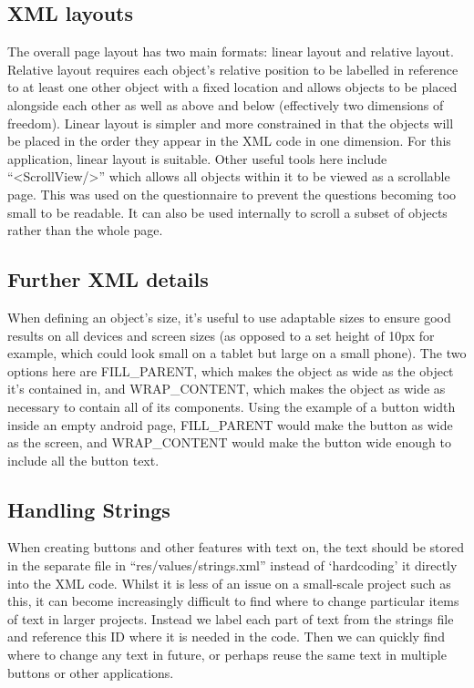 \subsection{XML layouts}
The overall page layout has two main formats: linear layout and relative layout. Relative layout requires each object’s relative position to be labelled in reference to at least one other object with a fixed location and allows objects to be placed alongside each other as well as above and below (effectively two dimensions of freedom). Linear layout is simpler and more constrained in that the objects will be placed in the order they appear in the XML code in one dimension. For this application, linear layout is suitable. Other useful tools here include ``\textless ScrollView/\textgreater'' which allows all objects within it to be viewed as a scrollable page. This was used on the questionnaire to prevent the questions becoming too small to be readable. It can also be used internally to scroll a subset of objects rather than the whole page.
\subsection{Further XML details}
When defining an object’s size, it’s useful to use adaptable sizes to ensure good results on all devices and screen sizes (as opposed to a set height of 10px for example, which could look small on a tablet but large on a small phone). The two options here are FILL\_PARENT, which makes the object as wide as the object it’s contained in, and WRAP\_CONTENT, which makes the object as wide as necessary to contain all of its components. Using the example of a button width inside an empty android page, FILL\_PARENT would make the button as wide as the screen, and WRAP\_CONTENT would make the button wide enough to include all the button text.
\subsection{Handling Strings}
When creating buttons and other features with text on, the text should be stored in the separate file in ``res/values/strings.xml'' instead of ‘hardcoding’ it directly into the XML code. Whilst it is less of an issue on a small-scale project such as this, it can become increasingly difficult to find where to change particular items of text in larger projects. Instead we label each part of text from the strings file and reference this ID where it is needed in the code. Then we can quickly find where to change any text in future, or perhaps reuse the same text in multiple buttons or other applications.
